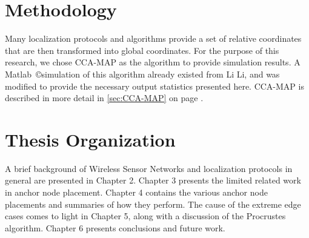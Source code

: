 \section{Methodology}
Many localization protocols and algorithms provide a set of relative coordinates that are then transformed into global coordinates.  For the purpose of this research, we chose CCA-MAP\cite{CCA-MAP07,CCA-MAP09} as the algorithm to provide simulation results.  A Matlab~\copyright simulation of this algorithm already existed from Li Li\cite{CCA-MAP07}, and was modified to provide the necessary output statistics presented here.  CCA-MAP is described in more detail in \ref{sec:CCA-MAP} on page \pageref{sec:CCA-MAP}.

\section{Thesis Organization}
A brief background of Wireless Sensor Networks and localization protocols in general are presented in Chapter 2.  Chapter 3 presents the limited related work in anchor node placement.  Chapter 4 contains the various anchor node placements and summaries of how they perform.  The cause of the extreme edge cases comes to light in Chapter 5, along with a discussion of the Procrustes algorithm.  Chapter 6 presents conclusions and future work.

